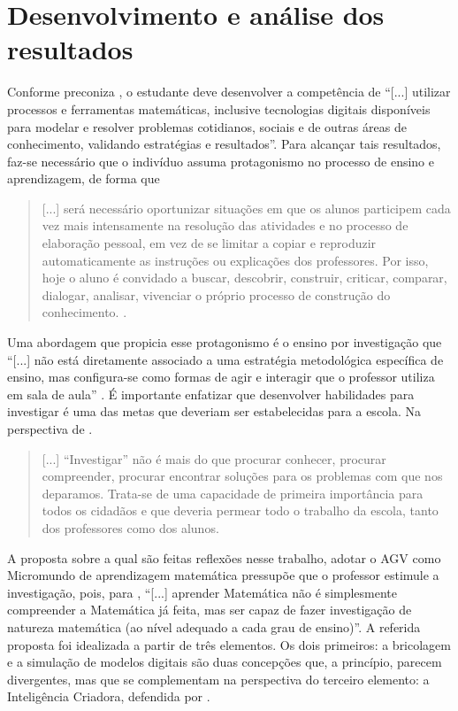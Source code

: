 \documentclass[portuguese]{textolivre}
\begin{document}
\section{Desenvolvimento e análise dos resultados}\label{sec-organizacao}
Conforme preconiza \textcite[p. 267]{brasil2017}, o estudante deve desenvolver a competência de “[...] utilizar processos e ferramentas matemáticas, inclusive tecnologias digitais disponíveis para modelar e resolver problemas cotidianos, sociais e de outras áreas de conhecimento, validando estratégias e resultados”. Para alcançar tais resultados, faz-se necessário que o indivíduo assuma protagonismo no processo de ensino e aprendizagem, de forma que

\begin{quote}
[...] será necessário oportunizar situações em que os alunos participem cada vez mais intensamente na resolução das atividades e no processo de elaboração pessoal, em vez de se limitar a copiar e reproduzir automaticamente as instruções ou explicações dos professores. Por isso, hoje o aluno é convidado a buscar, descobrir, construir, criticar, comparar, dialogar, analisar, vivenciar o próprio processo de construção do conhecimento. \cite[p. 119]{Zabala1998}.
\end{quote}

Uma abordagem que propicia esse protagonismo é o ensino por investigação que “[...] não está diretamente associado a uma estratégia metodológica específica de ensino, mas configura-se como formas de agir e interagir que o professor utiliza em sala de aula” \cite[p. 3]{Snef2015}. É importante enfatizar que desenvolver habilidades para investigar é uma das metas que deveriam ser estabelecidas para a escola. Na perspectiva de \textcite[p. 2]{Ponte2003}.

\begin{quote}
[...] “Investigar” não é mais do que procurar conhecer, procurar compreender, procurar encontrar soluções para os problemas com que nos deparamos. Trata-se de uma capacidade de primeira importância para todos os cidadãos e que deveria permear todo o trabalho da escola, tanto dos professores como dos alunos.
\end{quote}

A proposta sobre a qual são feitas reflexões nesse trabalho, adotar o AGV como Micromundo de aprendizagem matemática pressupõe que o professor estimule a investigação, pois, para \textcite[p. 5]{BraumannCarlos2002}, “[...] aprender Matemática não é simplesmente compreender a Matemática já feita, mas ser capaz de fazer investigação de natureza matemática (ao nível adequado a cada grau de ensino)”. A referida proposta foi idealizada a partir de três elementos. Os dois primeiros: a bricolagem e a simulação de modelos digitais são duas concepções que, a princípio, parecem divergentes, mas que se complementam na perspectiva do terceiro elemento: a Inteligência Criadora, defendida por \textcite{Marina2009}.
\end{document}
